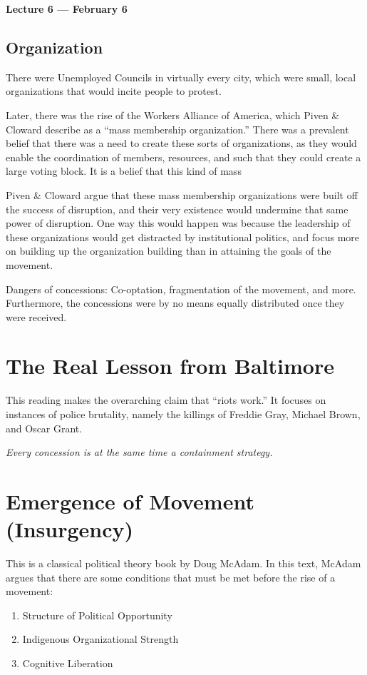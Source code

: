 \vspace{3mm}
\noindent \textbf{Lecture 6 --- February 6\th}

\subsection{Organization}
There were Unemployed Councils in virtually every city, which were small, local organizations that would incite people to protest.

Later, there was the rise of the Workers Alliance of America, which Piven \& Cloward describe as a ``mass membership organization.''
There was a prevalent belief that there was a need to create these sorts of organizations, as they would enable the coordination of members, resources, and such that they could create a large voting block.
It is a belief that this kind of mass

Piven \& Cloward argue that these mass membership organizations were built off the success of disruption, and their very existence would undermine that same power of disruption.
One way this would happen was because the leadership of these organizations would get distracted by institutional politics, and focus more on building up the organization building than in attaining the goals of the movement.

Dangers of concessions:
Co-optation, fragmentation of the movement, and more.
Furthermore, the concessions were by no means equally distributed once they were received.

\section{The Real Lesson from Baltimore}
This reading makes the overarching claim that ``riots work.''
It focuses on instances of police brutality, namely the killings of Freddie Gray, Michael Brown, and Oscar Grant.

\begin{center}
    \textit{Every concession is at the same time a containment strategy.}
\end{center}

\section{Emergence of Movement (Insurgency)}
This is a classical political theory book by Doug McAdam.
In this text, McAdam argues that there are some conditions that must be met before the rise of a movement:
\begin{enumerate}
    \item Structure of Political Opportunity
    \item Indigenous Organizational Strength
    \item Cognitive Liberation
\end{enumerate}

